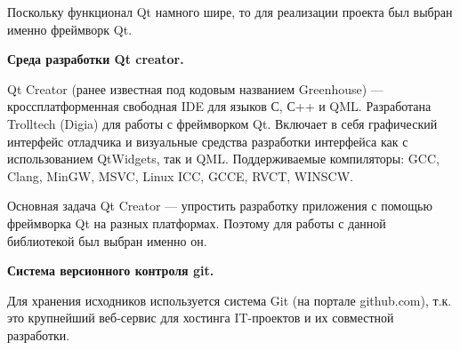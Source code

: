 Поскольку функционал Qt намного шире, то для реализации проекта был выбран именно фреймворк Qt.

\noindent\textbf{Среда разработки Qt creator.}

Qt Creator (ранее известная под кодовым названием Greenhouse) — кроссплатформенная свободная IDE для языков С, С++ и QML. Разработана Trolltech (Digia) для работы с фреймворком Qt. Включает в себя графический интерфейс отладчика и визуальные средства разработки интерфейса как с использованием QtWidgets, так и QML. Поддерживаемые компиляторы: GCC, Clang, MinGW, MSVC, Linux ICC, GCCE, RVCT, WINSCW.

Основная задача Qt Creator — упростить разработку приложения с помощью фреймворка Qt на разных платформах. Поэтому для работы с данной библиотекой был выбран именно он.

\noindent\textbf{Система версионного контроля git.}

Для хранения исходников используется система Git (на портале github.com), т.к. это крупнейший веб-сервис для хостинга IT-проектов и их совместной разработки. %